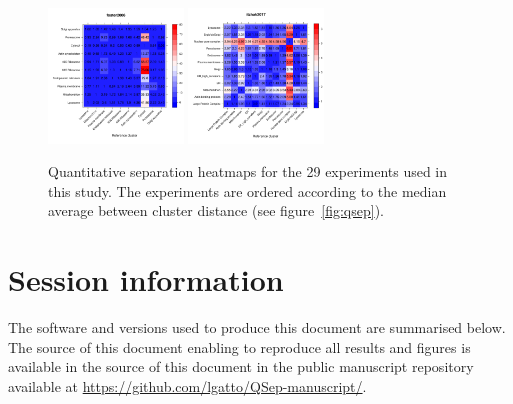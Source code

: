 \documentclass[12pt]{article}\usepackage[]{graphicx}\usepackage[]{color}
\begin{document}
\begin{appendices}
\begin{figure}[htb]
  \includegraphics[width = 0.32\textwidth]{./figure/allhmaps-27.pdf}
  \includegraphics[width = 0.32\textwidth]{./figure/allhmaps-28.pdf}
  \caption{Quantitative separation heatmaps for the 29
    experiments used in this study. The experiments are ordered
    according to the median average between cluster distance (see
    figure~\ref{fig:qsep}). }
  \ContinuedFloat
  \label{fig:allhmaps}
\end{figure}

\clearpage

\section{Session information}

The software and versions used to produce this document are summarised
below. The source of this document enabling to reproduce all results
and figures is available in the source of this document in the public
manuscript repository~\cite{qseprepo} available at
\url{https://github.com/lgatto/QSep-manuscript/}.


\end{appendices}
\end{document}
